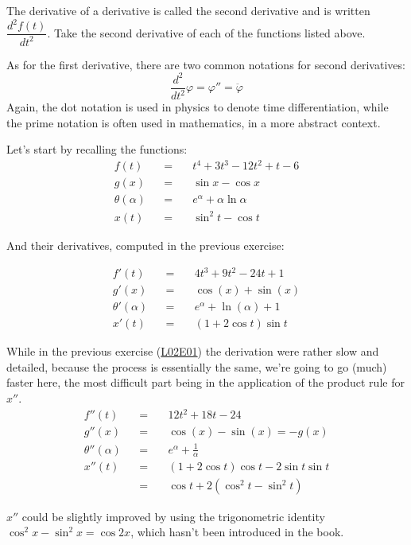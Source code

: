 \documentclass[solutions.tex]{subfiles}
\begin{document}
\maketitle
\begin{exercise} The derivative of a derivative is called the
second derivative and is written $\dfrac{d^2 f(t)}{dt^2}$. Take
the second derivative of each of the functions listed above.
\end{exercise}
\begin{remark} As for the first derivative, there are
two common notations for second derivatives:
\[
	\frac{d^2}{dt^2}\varphi = \varphi'' = \ddot\varphi
\]
Again, the dot notation is used in physics to denote time differentiation,
while the prime notation is often used in mathematics, in a more abstract context.
\end{remark}
Let's start by recalling the functions:
\begin{equation*} \begin{aligned}
	f(t) &&=\quad& t^4 + 3t^3 - 12t^2 + t - 6 \\
	g(x) &&=\quad& \sin x - \cos x \\
	\theta(\alpha) &&=\quad& e^\alpha + \alpha\ln\alpha \\
	x(t) &&=\quad& \sin^2t - \cos t
\end{aligned} \end{equation*}

And their derivatives, computed in the previous exercise:

\begin{equation*} \begin{aligned}
	f'(t)  &&=\quad& 4t^3 + 9t^2-24t+1 \\
	g'(x) &&=\quad& \cos(x)+\sin(x) \\
	\theta'(\alpha) &&=\quad& e^\alpha+\ln(\alpha)+1 \\
	x'(t) &&=\quad& (1+2\cos t)\sin t
\end{aligned} \end{equation*}

While in the previous exercise
(\href{https://github.com/mbivert/ttm/blob/master/cm/L02E01.pdf}{L02E01})
the derivation were rather slow and detailed, because the process
is essentially the same, we're going to go (much) faster here, the most
difficult part being in the application of the product rule for $x''$.
\begin{equation*} \begin{aligned}
	f''(t)  &&=\quad& \boxed{12t^2 + 18t-24} \\
	g''(x) &&=\quad& \boxed{\cos(x)-\sin(x) = -g(x)} \\
	\theta''(\alpha) &&=\quad& \boxed{e^\alpha+\frac{1}\alpha} \\
	x''(t) &&=\quad& (1+2\cos t)\cos t -2\sin t\sin t \\
	~ &&=\quad& \boxed{\cos t +2(\cos^2 t - \sin^2t)}
\end{aligned} \end{equation*}
\begin{remark} $x''$ could be slightly improved by using
the trigonometric identity $\cos^2x-\sin^2x = \cos2x$, which hasn't
been introduced in the book.
\end{remark}
\end{document}
